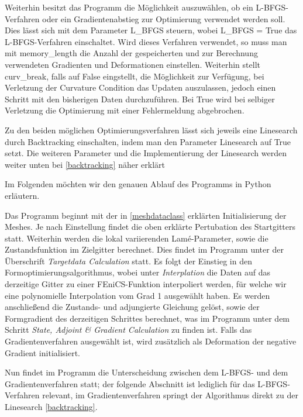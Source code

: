 Weiterhin besitzt das Programm die Möglichkeit auszuwählen, ob ein L-BFGS-Verfahren oder ein Gradientenabstieg zur Optimierung verwendet werden soll. Dies lässt sich mit dem Parameter \textsf{L\_BFGS} steuern, wobei \textsf{L\_BFGS = True} das L-BFGS-Verfahren einschaltet. Wird dieses Verfahren verwendet, so muss man mit \textsf{memory\_length} die Anzahl der gespeicherten und zur Berechnung verwendeten Gradienten und Deformationen einstellen. Weiterhin stellt \textsf{curv\_break}, falls auf \textsf{False} eingstellt, die Möglichkeit zur Verfügung, bei Verletzung der Curvature Condition das Updaten auszulassen, jedoch einen Schritt mit den bisherigen Daten durchzuführen. Bei \textsf{True} wird bei selbiger Verletzung die Optimierung mit einer Fehlermeldung abgebrochen.

Zu den beiden möglichen Optimierungsverfahren lässt sich jeweils eine Linesearch durch Backtracking einschalten, indem man den Parameter \textsf{Linesearch} auf \textsf{True} setzt. Die weiteren Parameter und die Implementierung der Linesearch werden weiter unten bei \ref{backtracking} näher erklärt

Im Folgenden möchten wir den genauen Ablauf des Programms in Python erläutern. 

Das Programm beginnt mit der in \ref{meshdataclass} erklärten Initialisierung der Meshes. Je nach Einstellung findet die oben erklärte Pertubation des Startgitters statt. Weiterhin werden die lokal variierenden Lamé-Parameter, sowie die Zustandsfunktion im Zielgitter berechnet. Dies findet im Programm unter der Überschrift \textit{Targetdata Calculation} statt. Es folgt der Einstieg in den Formoptimierungsalgorithmus, wobei unter \textit{Interplation} die Daten auf das derzeitige Gitter zu einer FEniCS-Funktion interpoliert werden, für welche wir eine polynomielle Interpolation vom Grad 1 ausgewählt haben. Es werden anschließend die Zustands- und adjungierte Gleichung gelöst, sowie der Formgradient des derzeitigen Schrittes berechnet, was im Programm unter dem Schritt \textit{State, Adjoint \& Gradient Calculation} zu finden ist. Falls das Gradientenverfahren ausgewählt ist, wird zusätzlich als Deformation der negative Gradient initialisiert. 

Nun findet im Programm die Unterscheidung zwischen dem L-BFGS- und dem Gradientenverfahren statt; der folgende Abschnitt ist lediglich für das L-BFGS-Verfahren relevant, im Gradientenverfahren springt der Algorithmus direkt zu der Linesearch \ref{backtracking}.

